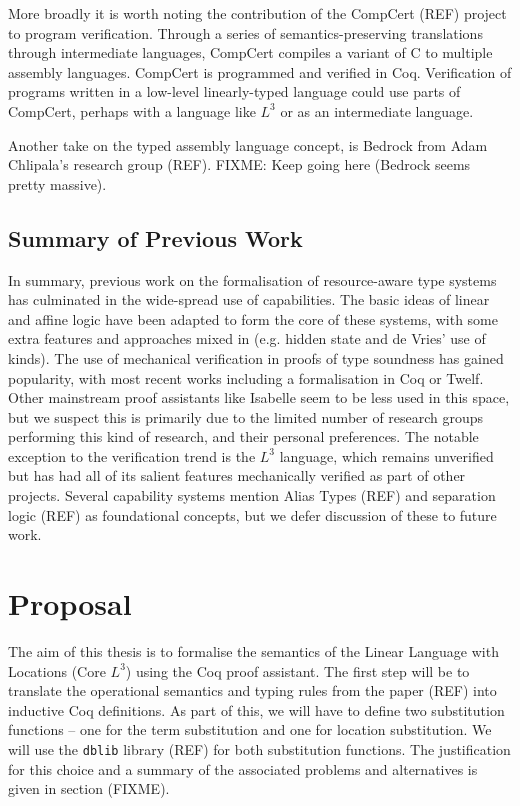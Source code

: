 \documentclass[]{unswthesis}
\newcommand{\SSPHS}{\text{SSPHS }}
\begin{document}
More broadly it is worth noting the contribution of the CompCert (REF) project to program verification. Through a series of semantics-preserving translations through intermediate languages, CompCert compiles a variant of C to multiple assembly languages. CompCert is programmed and verified in Coq. Verification of programs written in a low-level linearly-typed language could use parts of CompCert, perhaps with a language like $L^3$ or \SSPHS as an intermediate language.

Another take on the typed assembly language concept, is Bedrock from Adam Chlipala's research group (REF). FIXME: Keep going here (Bedrock seems pretty massive).


\section{Summary of Previous Work}

In summary, previous work on the formalisation of resource-aware type systems has culminated in the wide-spread use of capabilities. The basic ideas of linear and affine logic have been adapted to form the core of these systems, with some extra features and approaches mixed in (e.g. hidden state and de Vries' use of kinds). The use of mechanical verification in proofs of type soundness has gained popularity, with most recent works including a formalisation in Coq or Twelf. Other mainstream proof assistants like Isabelle seem to be less used in this space, but we suspect this is primarily due to the limited number of research groups performing this kind of research, and their personal preferences. The notable exception to the verification trend is the $L^3$ language, which remains unverified but has had all of its salient features mechanically verified as part of other projects. Several capability systems mention Alias Types (REF) and separation logic (REF) as foundational concepts, but we defer discussion of these to future work.

\chapter{Proposal}
\label{ch:proposal}

The aim of this thesis is to formalise the semantics of the Linear Language with Locations (Core $L^3$) using the Coq proof assistant. The first step will be to translate the operational semantics and typing rules from the paper (REF) into inductive Coq definitions. As part of this, we will have to define two substitution functions -- one for the term substitution and one for location substitution. We will use the \texttt{dblib} library (REF) for both substitution functions. The justification for this choice and a summary of the associated problems and alternatives is given in section (FIXME).
\end{document}
